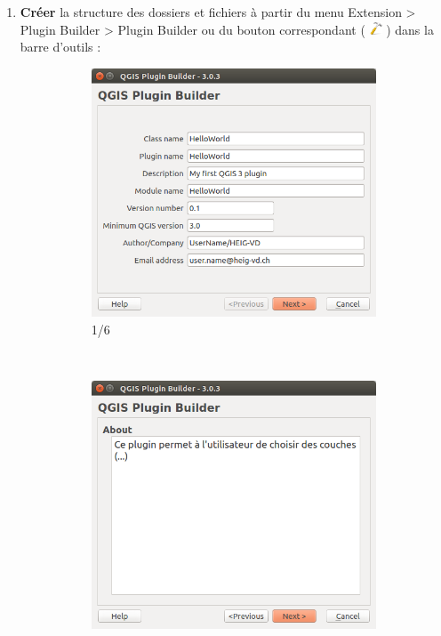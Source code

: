 \documentclass[11pt]{article}
\begin{document}
\begin{enumerate}\itemsep0.4em
\item \textbf{Créer} la structure des dossiers et fichiers à partir du menu \og{}Extension > Plugin Builder > Plugin Builder\fg{} ou du bouton correspondant ( \includegraphics[width=1em]{pluginbuilder.png} ) dans la barre d'outils : 

\vspace*{-1em}
\hspace*{-8em}
\begin{minipage}[t]{0.9\paperwidth}
\begin{figure}[H]
    \centering
    \begin{subfigure}[t]{0.32\textwidth}
		\centering
        \includegraphics[width=1\textwidth]{pluginbuilder3_1.png}
		\caption{1/6}\label{pluginbuilder:1}
    \end{subfigure}%
    ~
    \begin{subfigure}[t]{0.32\textwidth}
        \centering
        \includegraphics[width=1\textwidth]{pluginbuilder3_2.png}

\end{subfigure}
\end{figure}
\end{minipage}
\end{enumerate}
\end{document}
